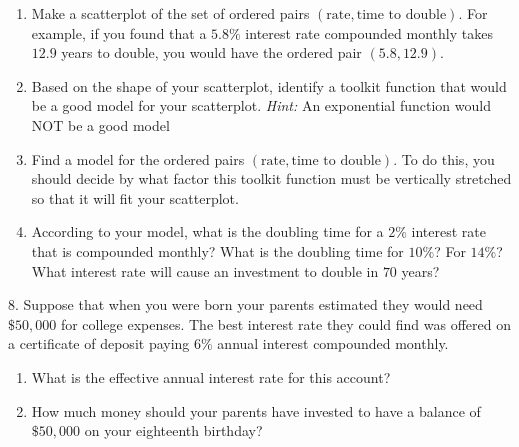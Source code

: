 \documentclass[10pt,]{book}
\theoremstyle{plain}
\theoremstyle{definition}
\theoremstyle{definition}
\theoremstyle{definition}
\numberwithin{equation}{section}
\newlength{\panelmax}
\begin{document}
\begin{exerciselist}
\begin{enumerate}[label=(\alph*)]
{\leavevmode%
\setlength{\tabcolsep}{0\linewidth}
\par\medskip\noindent
\begin{tabular}{@{}*{1}{c}@{}}
\begin{minipage}[c][\panelmax][t]{1\linewidth}\usebox{\panelboxAtabular}\end{minipage}\end{tabular}\\
}%
\item\hypertarget{li-109}{}Make a scatterplot of the set of ordered pairs \((\text{rate}, \text{time to double})\). For example, if you found that a \(5.8\%\) interest rate compounded monthly takes \(12.9\) years to double, you would have the ordered pair \((5.8, 12.9)\).%
\item\hypertarget{li-110}{}Based on the shape of your scatterplot, identify a toolkit function that would be a good model for your scatterplot.  \emph{Hint:} An exponential function would NOT be a good model%
\item\hypertarget{li-111}{}Find a model for the ordered pairs \((\text{rate}, \text{time to double})\). To do this, you should decide by what factor this toolkit function must be vertically stretched so that it will fit your scatterplot.%
\item\hypertarget{li-112}{}According to your model, what is the doubling time for a \(2\%\) interest rate that is compounded monthly?  What is the doubling time for \(10\%\)?  For \(14\%\)? What interest rate will cause an investment to double in \(70\) years?%
\end{enumerate}
\par\smallskip
\item[8.]\hypertarget{exercise-57}{}\hypertarget{p-229}{}%
Suppose that when you were born your parents estimated they would need \(\$50,000\) for college expenses.  The best interest rate they could find was offered on a certificate of deposit paying \(6\%\) annual interest compounded monthly.%
\leavevmode%
\begin{enumerate}[label=(\alph*)]
\item\hypertarget{li-113}{}What is the effective annual interest rate for this account?%
\item\hypertarget{li-114}{}How much money should your parents have invested to have a balance of \(\$50,000\) on your eighteenth birthday?%

\end{enumerate}
\end{exerciselist}
\end{document}
